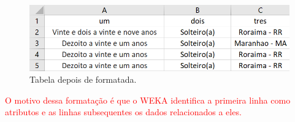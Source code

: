 \par
\begin{figure}[!htp]
	\begin{center}
    \caption{\label{fig:waveform_fig} Tabela depois de formatada.}
	\includegraphics[scale=0.65]{Figuras/Formato_certo.png}
	\end{center}
\end{figure}

\par
\textcolor{red}{O motivo dessa formatação é que o WEKA identifica a primeira linha como atributos e as linhas subsequentes os dados relacionados a eles.}

